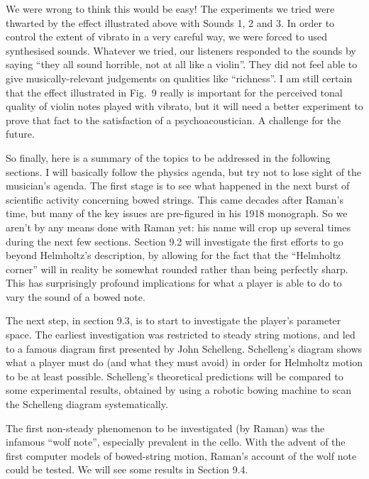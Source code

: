   We were wrong to think this would be easy! The experiments we tried were 
  thwarted by the effect illustrated above with Sounds 1, 2 and 3. In order to 
  control the extent of vibrato in a very careful way, we were forced to used 
  synthesised sounds. Whatever we tried, our listeners responded to the sounds 
  by saying “they all sound horrible, not at all like a violin”. They did not 
  feel able to give musically-relevant judgements on qualities like “richness”. 
  I am still certain that the effect illustrated in Fig.\ 9 really is important 
  for the perceived tonal quality of violin notes played with vibrato, but it 
  will need a better experiment to prove that fact to the satisfaction of a 
  psychoacoustician. A challenge for the future. 

  So finally, here is a summary of the topics to be addressed in the following 
  sections. I will basically follow the physics agenda, but try not to lose 
  sight of the musician’s agenda. The first stage is to see what happened in 
  the next burst of scientific activity concerning bowed strings. This came 
  decades after Raman’s time, but many of the key issues are pre-figured in his 
  1918 monograph. So we aren’t by any means done with Raman yet: his name will 
  crop up several times during the next few sections. Section 9.2 will 
  investigate the first efforts to go beyond Helmholtz’s description, by 
  allowing for the fact that the “Helmholtz corner” will in reality be somewhat 
  rounded rather than being perfectly sharp. This has surprisingly profound 
  implications for what a player is able to do to vary the sound of a bowed 
  note. 

  The next step, in section 9.3, is to start to investigate the player’s 
  parameter space. The earliest investigation was restricted to steady string 
  motions, and led to a famous diagram first presented by John Schelleng. 
  Schelleng’s diagram shows what a player must do (and what they must avoid) in 
  order for Helmholtz motion to be at least possible. Schelleng’s theoretical 
  predictions will be compared to some experimental results, obtained by using 
  a robotic bowing machine to scan the Schelleng diagram systematically. 

  The first non-steady phenomenon to be investigated (by Raman) was the 
  infamous “wolf note”, especially prevalent in the cello. With the advent of 
  the first computer models of bowed-string motion, Raman’s account of the wolf 
  note could be tested. We will see some results in Section 9.4. 

